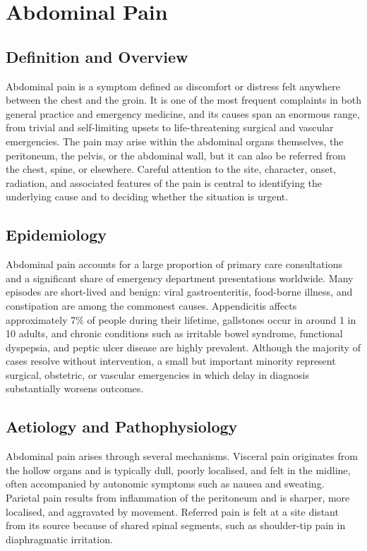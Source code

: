 \chapter{Abdominal Pain}

\section*{Definition and Overview}
Abdominal pain is a symptom defined as discomfort or distress felt anywhere between the chest and the groin. It is one of the most frequent complaints in both general practice and emergency medicine, and its causes span an enormous range, from trivial and self-limiting upsets to life-threatening surgical and vascular emergencies. The pain may arise within the abdominal organs themselves, the peritoneum, the pelvis, or the abdominal wall, but it can also be referred from the chest, spine, or elsewhere. Careful attention to the site, character, onset, radiation, and associated features of the pain is central to identifying the underlying cause and to deciding whether the situation is urgent.

\section*{Epidemiology}
Abdominal pain accounts for a large proportion of primary care consultations and a significant share of emergency department presentations worldwide. Many episodes are short-lived and benign: viral gastroenteritis, food-borne illness, and constipation are among the commonest causes. Appendicitis affects approximately 7\% of people during their lifetime, gallstones occur in around 1 in 10 adults, and chronic conditions such as irritable bowel syndrome, functional dyspepsia, and peptic ulcer disease are highly prevalent. Although the majority of cases resolve without intervention, a small but important minority represent surgical, obstetric, or vascular emergencies in which delay in diagnosis substantially worsens outcomes.

\section*{Aetiology and Pathophysiology}
Abdominal pain arises through several mechanisms. Visceral pain originates from the hollow organs and is typically dull, poorly localised, and felt in the midline, often accompanied by autonomic symptoms such as nausea and sweating. Parietal pain results from inflammation of the peritoneum and is sharper, more localised, and aggravated by movement. Referred pain is felt at a site distant from its source because of shared spinal segments, such as shoulder-tip pain in diaphragmatic irritation.


